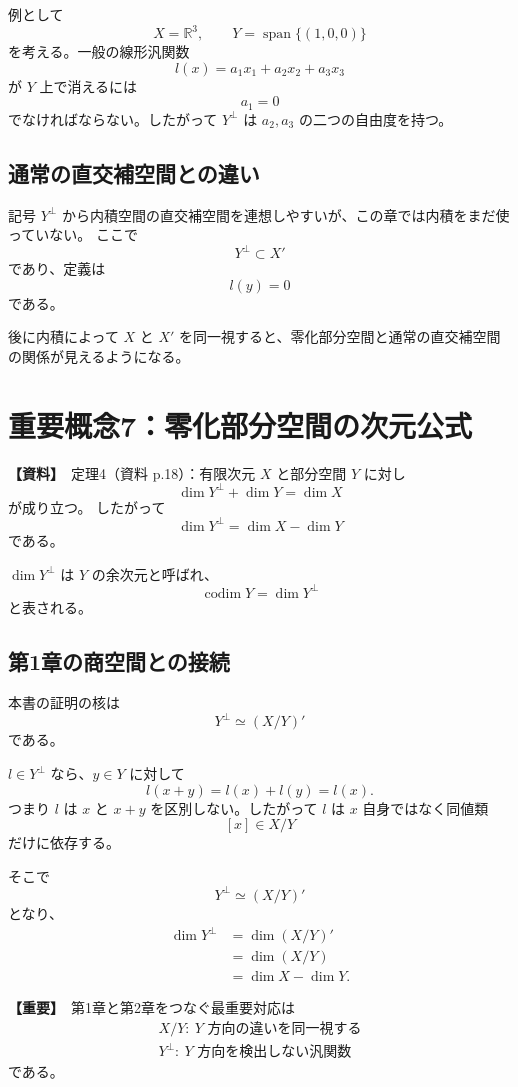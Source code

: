 \documentclass[a4paper,11pt]{ltjsarticle}
\newcommand{\R}{\mathbb{R}}
\newcommand{\Span}{\operatorname{span}}
\newcommand{\codim}{\operatorname{codim}}
\newcommand{\sourceitem}{\textbf{【資料】}}
\newcommand{\highimportance}{\textbf{【重要】}}
\begin{document}
例として
\[
X=\R^3,\qquad Y=\Span\{(1,0,0)\}
\]
を考える。一般の線形汎関数
\[
l(x)=a_1x_1+a_2x_2+a_3x_3
\]
が $Y$ 上で消えるには
\[
a_1=0
\]
でなければならない。したがって $Y^\perp$ は $a_2,a_3$ の二つの自由度を持つ。

\subsection{通常の直交補空間との違い}
記号 $Y^\perp$ から内積空間の直交補空間を連想しやすいが、この章では内積をまだ使っていない。
ここで
\[
Y^\perp\subset X'
\]
であり、定義は
\[
l(y)=0
\]
である。

後に内積によって $X$ と $X'$ を同一視すると、零化部分空間と通常の直交補空間の関係が見えるようになる。

\section{重要概念7：零化部分空間の次元公式}

\sourceitem\ 定理4（資料 p.18）：有限次元 $X$ と部分空間 $Y$ に対し
\[
\boxed{
\dim Y^\perp+\dim Y=\dim X
}
\]
が成り立つ。
したがって
\[
\boxed{\dim Y^\perp=\dim X-\dim Y}
\]
である。

$\dim Y^\perp$ は $Y$ の余次元と呼ばれ、
\[
\codim Y=\dim Y^\perp
\]
と表される。

\subsection{第1章の商空間との接続}
本書の証明の核は
\[
\boxed{Y^\perp\simeq (X/Y)'}
\]
である。

$l\in Y^\perp$ なら、$y\in Y$ に対して
\[
l(x+y)=l(x)+l(y)=l(x).
\]
つまり $l$ は $x$ と $x+y$ を区別しない。したがって $l$ は $x$ 自身ではなく同値類
\[
[x]\in X/Y
\]
だけに依存する。

そこで
\[
Y^\perp\simeq (X/Y)'
\]
となり、
\begin{align*}
\dim Y^\perp
&=\dim (X/Y)'\\
&=\dim(X/Y)\\
&=\dim X-\dim Y.
\end{align*}

\highimportance\ 第1章と第2章をつなぐ最重要対応は
\[
\boxed{
\begin{array}{c}
X/Y:\ \text{$Y$ 方向の違いを同一視する}\\[3pt]
Y^\perp:\ \text{$Y$ 方向を検出しない汎関数}
\end{array}}
\]
である。
\end{document}
